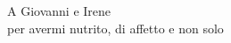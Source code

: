 \newpage
\thispagestyle{plain}
\vspace*{\fill}
\begin{flushright}
A Giovanni e Irene \\
per avermi nutrito, di affetto e non solo
\end{flushright}
\vspace*{\fill}
